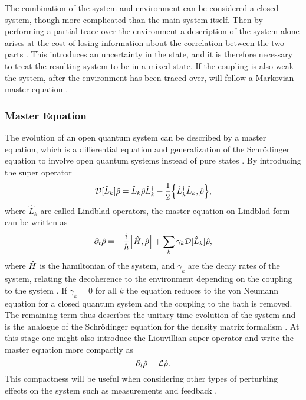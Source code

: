 The combination of the system and environment can be considered a closed system, though more complicated than the main system itself. Then by performing a partial trace over the environment a description of the system alone arises at the cost of losing information about the correlation between the two parts \cite{Annby-Andersson:2024}. This introduces an uncertainty in the state, and it is therefore necessary to treat the resulting system to be in a mixed state. If the coupling is also weak the system, after the environment has been traced over, will follow a Markovian master equation \cite{Annby-Andersson:2024}.

\subsubsection{Master Equation}
The evolution of an open quantum system can be described by a master equation, which is a differential equation and generalization of the Schrödinger equation to involve open quantum systems instead of pure states \cite{Annby-Andersson:2024}. By introducing the super operator
\begin{equation}
    \super{\hat{L}_k}\dmatrix = \hat{L}_k\dmatrix\hat{L}_k^{\dagger} - \frac{1}{2} \acomm{\hat{L}_k^\dagger \hat{L}_k}{\dmatrix},
\end{equation} 
where $\hat{L}_k$ are called Lindblad operators, the master equation on Lindblad form can be written as 
\begin{equation}
    \dt\dmatrix = -\frac{i}{\hbar}\comm{\hamiltonian}{\dmatrix} + \sum_k \gamma_k\super{\hat{L}_k}\dmatrix,
\end{equation}
where $\hat{H}$ is the hamiltonian of the system, and $\gamma_k$ are the decay rates of the system, relating the decoherence to the environment depending on the coupling to the system \cite{Annby-Andersson:2024}. If $\gamma_k = 0$ for all $k$ the equation reduces to the von Neumann equation for a closed quantum system and the coupling to the bath is removed. The remaining term thus describes the unitary time evolution of the system and is the analogue of the Schrödinger equation for the density matrix formalism \cite{Annby-Andersson:2024}. At this stage one might also introduce the Liouvillian super operator and write the master equation more compactly as
\begin{equation}
    \partial_t\hat{\rho} = \mathcal{L}\hat{\rho}.
\end{equation}
This compactness will be useful when considering other types of perturbing effects on the system such as measurements and feedback \cite{Annby-Andersson:2024}.

